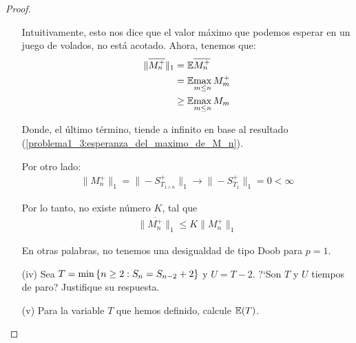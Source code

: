 \begin{proof}
\begin{enumerate}
			Intuitivamente, esto nos dice que el valor máximo que podemos esperar en un juego de volados, no está acotado.
			Ahora, tenemos que:
			\begin{align}
				\|\overline{M_{n}^{+}}\|_1  &=    \mathbb{E}{\overline{M_{n}^{+}}} \\
											&=    \mathbb{E}{\max_{m \leq n}M_m^+} \\
											&\geq \mathbb{E}{\max_{m \leq n}M_m}										
			\end{align}
				
			Donde, el último término, tiende a infinito en base al resultado 
			(\ref{problema1_3:esperanza_del_maximo_de_M_n}).

			Por otro lado:
			\begin{align}
				\|M_n^+\|_1=\|-S_{T_{1\wedge n}}^{+}\|_1  \longrightarrow  \|-S_{T_1}^+\|_1 = 0 < \infty
			\end{align}
			
			Por lo tanto, no existe número $K$, tal que
			\begin{align}
				 \|\overline{M_n^+}\|_1 \leq  K \|M_n^+\|_1
			\end{align}
			
			En otras palabras, no tenemos una desigualdad de tipo Doob para $p=1$.\\
			
		\item[(iv)]  
		Sea $T=\min\left\{ n\geq 2:S_n=S_{n-2} + 2\right\} $ y $U=T-2$. ?`Son $T$ y $U$ 
		tiempos de paro? Justifique su respuesta.\\
					
		\item[(v)] Para la variable $T$ que hemos definido, calcule $\mathbb{E}\! \left( T \right)$.\\
		
	\end{enumerate}
\end{proof}